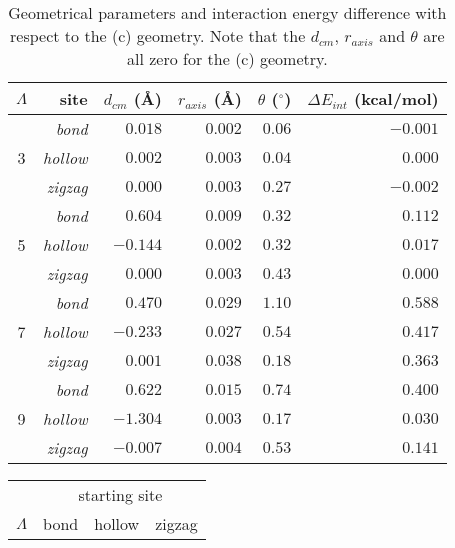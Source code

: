 \def\btab#1#2{\expandafter\gdef\csname tab-#1\endcsname{\begin{table}[ht]#2\label{#1}\end{table}}}
\def\tref#1{\csname tab-#1\endcsname\Cref{#1}}

\btab{tab:geom_comp}{
    \centering
    \begin{tabular}{crrrrr}
        \toprule
        \textit{$\Lambda$} & site & $d_{cm}$ (\AA) & $r_{axis}$ (\AA) & $\theta$ ($^{\circ}$) & $\Delta E_{int}$ (kcal/mol) \\
        \midrule
        \multirow{3}{*}{3} & \textit{bond} & $ 0.018$ & $ 0.002$ & $0.06$ & $-0.001$ \\
        ~ & \textit{hollow}                & $ 0.002$ & $ 0.003$ & $0.04$ & $ 0.000$ \\
        ~ & \textit{zigzag}                & $ 0.000$ & $ 0.003$ & $0.27$ & $-0.002$ \\
        \midrule
        \multirow{3}{*}{5} & \textit{bond} & $ 0.604$ & $ 0.009$ & $0.32$ & $ 0.112$ \\
        ~ & \textit{hollow}                & $-0.144$ & $ 0.002$ & $0.32$ & $ 0.017$ \\
        ~ & \textit{zigzag}                & $ 0.000$ & $ 0.003$ & $0.43$ & $ 0.000$ \\
        \midrule
        \multirow{3}{*}{7} & \textit{bond} & $ 0.470$ & $ 0.029$ & $1.10$ & $ 0.588$ \\
        ~ & \textit{hollow}                & $-0.233$ & $ 0.027$ & $0.54$ & $ 0.417$ \\
        ~ & \textit{zigzag}                & $ 0.001$ & $ 0.038$ & $0.18$ & $ 0.363$ \\
        \midrule
        \multirow{3}{*}{9} & \textit{bond} & $ 0.622$ & $ 0.015$ & $0.74$ & $ 0.400$ \\
        ~ & \textit{hollow}                & $-1.304$ & $ 0.003$ & $0.17$ & $ 0.030$ \\
        ~ & \textit{zigzag}                & $-0.007$ & $ 0.004$ & $0.53$ & $ 0.141$ \\
        \bottomrule
    \end{tabular}
    \caption{Geometrical parameters and interaction energy difference with respect to the (c) geometry. Note that the $d_{cm}$, $r_{axis}$ and $\theta$ are all zero for the (c) geometry.}
}

\btab{tab:int_ene_rel_geo}{
    \centering
    \begin{tabular}{cccc}
        \toprule
        ~ & \multicolumn{3}{c}{starting site} \\
        $\Lambda$ & bond & hollow & zigzag \\
        \midrule
        \bottomrule
    \end{tabular}
}

